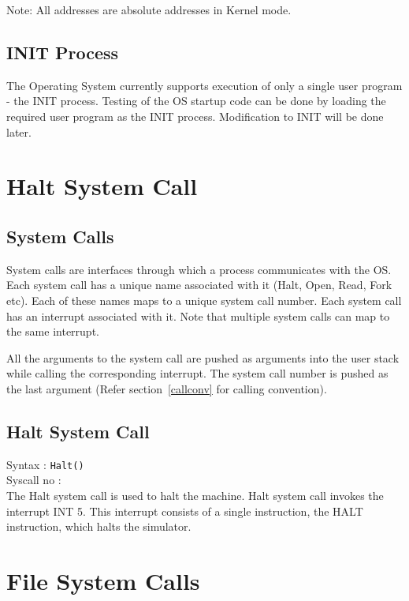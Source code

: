 \documentclass[11pt]{report}
\newcommand\counter[1]{\arabic{#1} \stepcounter{#1}}
\newcounter{syscall}
\begin{document}
Note: All addresses are absolute addresses in Kernel mode. 
\section{INIT Process}
\label{lbl:INITprocess}
The Operating System currently supports execution of only a single user program - the INIT process. Testing of the OS startup code can be done by loading the required user program as the INIT process. Modification to INIT will be done later.

\chapter{Halt System Call}
\label{chp:halt_system_calls}

\section{System Calls}
System calls are interfaces through which a process communicates with the OS. Each system call has a unique name associated with it (Halt, Open, Read, Fork etc). Each of these names maps to a unique system call number. Each system call has an interrupt associated with it. Note that multiple system calls can map to the same interrupt.

All the arguments to the system call are pushed as arguments into the user stack while calling the corresponding interrupt. The system call number is pushed as the last argument (Refer section~\ref{callconv} for calling convention).

\section{Halt System Call}
\label{haltsyscall}

Syntax : \texttt{Halt()} \\
Syscall no : \counter{syscall} \\

The Halt system call is used to halt the machine. Halt system call invokes the interrupt INT 5. This interrupt consists of a single instruction, the HALT instruction, which halts the simulator.

\chapter{File System Calls}
\label{chp:file_system_calls}
\end{document}

